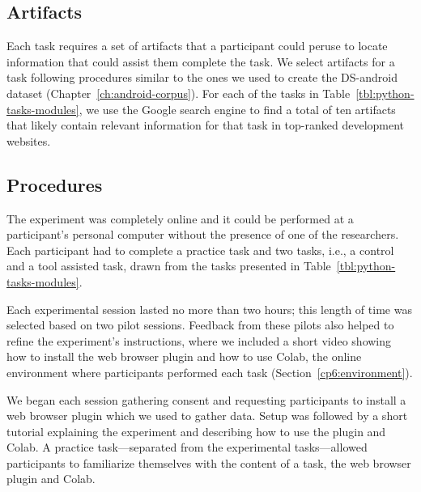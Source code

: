 {\clearpage




\subsection{Artifacts}
\label{sec:experiment-artifacts}


Each task requires a set of artifacts that a participant could peruse to locate information that could assist them complete the task.
We select artifacts for a task following procedures similar to the ones we used to create the \acs{DS-android} dataset (Chapter~\ref{ch:android-corpus}). 
For each of the tasks in Table~\ref{tbl:python-tasks-modules}, we use the Google search engine to find a total of ten artifacts that likely contain relevant
information for that task in top-ranked development websites. 






\subsection{Procedures}
\label{cp6:evaluation-procedures}



The experiment was completely online and it could be performed at a participant's personal computer
without the presence of one of the researchers. Each participant had to complete a practice task and two tasks, i.e., a control and a tool assisted task, drawn from the tasks presented in Table~\ref{tbl:python-tasks-modules}. 


Each experimental session lasted no more than two hours; this length of time was selected based on two pilot sessions. 
Feedback from these pilots also helped to refine the experiment's instructions, where we included a short video showing how to install the web browser plugin and how to use Colab, the online environment where participants performed each task (Section~\ref{cp6:environment}).






We began each session gathering consent and requesting participants to install a web browser plugin which we used to gather data.
Setup was followed by a short tutorial explaining the experiment and describing how to use the plugin and Colab. 
A practice task---separated from the experimental tasks---allowed participants to familiarize themselves with the content of a task, the web browser plugin and Colab. 



}
